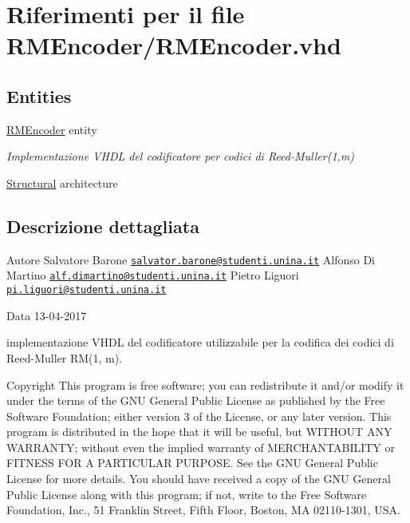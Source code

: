 \hypertarget{_r_m_encoder_8vhd}{\section{Riferimenti per il file R\+M\+Encoder/\+R\+M\+Encoder.vhd}
\label{_r_m_encoder_8vhd}
}
\subsection*{Entities}
\begin{DoxyCompactItemize}
\item 
\hyperlink{class_r_m_encoder}{R\+M\+Encoder} entity
\begin{DoxyCompactList}\small\item\em Implementazione V\+H\+D\+L del codificatore per codici di Reed-\/\+Muller(1,m) \end{DoxyCompactList}\item 
\hyperlink{class_r_m_encoder_1_1_structural}{Structural} architecture
\end{DoxyCompactItemize}


\subsection{Descrizione dettagliata}
\begin{DoxyAuthor}{Autore}
Salvatore Barone \href{mailto:salvator.barone@studenti.unina.it}{\tt salvator.\+barone@studenti.\+unina.\+it} Alfonso Di Martino \href{mailto:alf.dimartino@studenti.unina.it}{\tt alf.\+dimartino@studenti.\+unina.\+it} Pietro Liguori \href{mailto:pi.liguori@studenti.unina.it}{\tt pi.\+liguori@studenti.\+unina.\+it} 
\end{DoxyAuthor}
\begin{DoxyDate}{Data}
13-\/04-\/2017
\begin{DoxyItemize}
\item implementazione V\+H\+D\+L del codificatore utilizzabile per la codifica dei codici di Reed-\/\+Muller R\+M(1, m). 
\end{DoxyItemize}
\end{DoxyDate}
\begin{DoxyCopyright}{Copyright}
This program is free software; you can redistribute it and/or modify it under the terms of the G\+N\+U General Public License as published by the Free Software Foundation; either version 3 of the License, or any later version. This program is distributed in the hope that it will be useful, but W\+I\+T\+H\+O\+U\+T A\+N\+Y W\+A\+R\+R\+A\+N\+T\+Y; without even the implied warranty of M\+E\+R\+C\+H\+A\+N\+T\+A\+B\+I\+L\+I\+T\+Y or F\+I\+T\+N\+E\+S\+S F\+O\+R A P\+A\+R\+T\+I\+C\+U\+L\+A\+R P\+U\+R\+P\+O\+S\+E. See the G\+N\+U General Public License for more details. You should have received a copy of the G\+N\+U General Public License along with this program; if not, write to the Free Software Foundation, Inc., 51 Franklin Street, Fifth Floor, Boston, M\+A 02110-\/1301, U\+S\+A. 
\end{DoxyCopyright}
